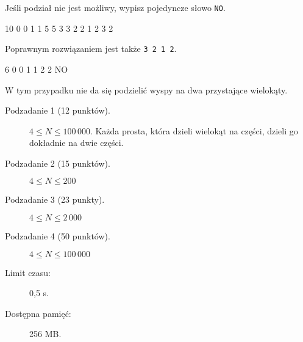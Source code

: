 \documentclass{boi2014-pl}
\newcommand{\constant}[1]{{\tt #1}}
\begin{document}
        Jeśli podział nie jest możliwy, wypisz pojedyncze słowo \constant{NO}.

    \clearpage

    \Examples
	\example
	{
		10  0  0  1  1  5  5  3  3  2  2
	}
	{
		1 2 3 2
	}
	{
        Poprawnym rozwiązaniem jest także {\tt 3 2 1 2}.
	
        \begin{center}
        \end{center}
        }

	\example
	{
		6  0  0  1  1  2  2
	}
	{
		NO
	}
        {
        W tym przypadku nie da się podzielić wyspy na dwa przystające wielokąty.
        \begin{center}
        \end{center}
        }

    \Scoring

    \begin{description}
        \item[Podzadanie 1 (12 punktów).] $4 \le N \le 100\,000$.
        Każda prosta, która dzieli wielokąt na części, dzieli go dokładnie na dwie części.
        \item[Podzadanie 2 (15 punktów).] $4 \le N \le 200$
        \item[Podzadanie 3 (23 punkty).] $4 \le N \le 2\, 000$
        \item[Podzadanie 4 (50 punktów).] $4 \le N \le 100\, 000$
    \end{description}

    \Constraints

    \begin{description}
        \item[Limit czasu:] 0,5 s.
        \item[Dostępna pamięć:] 256 MB.
    \end{description}
\end{document}
